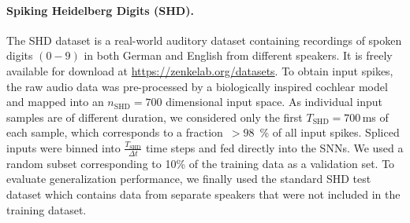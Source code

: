 \documentclass[11pt,a4paper]{article}
\begin{document}
\paragraph{Spiking Heidelberg Digits (SHD).} 
The SHD dataset \citep{cramer_heidelberg_2020} is a real-world auditory dataset containing recordings of spoken digits $(0-9)$ in both German and English from different speakers.
It is freely available for download at \href{https://zenkelab.org/datasets}{https://zenkelab.org/datasets}. 
To obtain input spikes, the raw audio data was pre-processed by a biologically inspired cochlear model \citep{cramer_heidelberg_2020} and mapped into an $n_{\mathrm{SHD}}=700$ dimensional input space. 
As individual input samples are of different duration, we considered only the first $T_{\text{SHD}}=700$\,ms of each sample, which corresponds to a \mbox{fraction $>98$ \%} of all input spikes. 
Spliced inputs were binned into $\frac{T_{\text{SHD}}}{\Delta t}$ time steps and fed directly into the \acp{SNN}. 
We used a random subset corresponding to 10\% of the training data as a validation set.
To evaluate generalization performance, we finally used the standard SHD test dataset which contains data from separate speakers that were not included in the training dataset.
\end{document}
